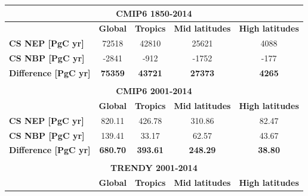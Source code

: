 \documentclass[9pt,twoside,lineno]{pnas-new_SI}
\begin{document}
\begin{table}[H]
\label{Table:CSdiff_NEP_NBP}
\centering
\begin{tabular}{lcccc}
\hline
\multicolumn{5}{c}{\textbf{CMIP6 1850-2014}}                                                                                       \\ \hline
\textbf{}                         & \textbf{Global}      & \textbf{Tropics}     & \textbf{Mid latitudes} & \textbf{High latitudes} \\
\textbf{CS NEP {[}PgC yr{]}}      & 72518              & 42810              & 25621                & 4088                 \\
\textbf{CS NBP {[}PgC yr{]}}      & -2841             & -912             & -1752               & -177               \\ \hline
\textbf{Difference  {[}PgC yr{]}} & \textbf{75359}     & \textbf{43721}     & \textbf{27373}       & \textbf{4265}        \\ \hline
                                  & \multicolumn{1}{l}{} & \multicolumn{1}{l}{} & \multicolumn{1}{l}{}   & \multicolumn{1}{l}{}    \\ \hline
\multicolumn{5}{c}{\textbf{CMIP6 2001-2014}}                                                                                       \\ \hline
\textbf{}                         & \textbf{Global}      & \textbf{Tropics}     & \textbf{Mid latitudes} & \textbf{High latitudes} \\
\textbf{CS NEP {[}PgC yr{]}}      & 820.11               & 426.78               & 310.86                 & 82.47                   \\
\textbf{CS NBP {[}PgC yr{]}}      & 139.41               & 33.17                & 62.57                  & 43.67                   \\
\textbf{Difference  {[}PgC yr{]}} & \textbf{680.70}      & \textbf{393.61}      & \textbf{248.29}        & \textbf{38.80}          \\ \hline
                                  & \multicolumn{1}{l}{} & \multicolumn{1}{l}{} & \multicolumn{1}{l}{}   & \multicolumn{1}{l}{}    \\ \hline
\multicolumn{5}{c}{\textbf{TRENDY 2001-2014}}                                                                                      \\ \hline
\textbf{}                         & \textbf{Global}      & \textbf{Tropics}     & \textbf{Mid latitudes} & \textbf{High latitudes} \\

\end{tabular}
\end{table}
\end{document}

